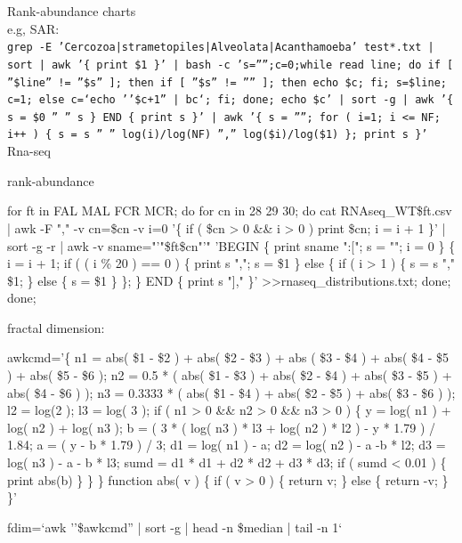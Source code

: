 \documentclass[a4paper]{article}
\begin{document}
Rank-abundance charts\\
e.g, SAR:\\
\texttt{\tiny{grep -E 'Cercozoa|strametopiles|Alveolata|Acanthamoeba' test*.txt | sort | awk '\{ print \$1 \}' |  bash -c 's='''';c=0;while read line; do if [ ''\$line'' != ''\$s'' ]; then if [ ''\$s'' != '''' ]; then echo \$c; fi; s=\$line; c=1; else c=`echo ''\$c+1'' | bc`; fi; done; echo \$c' | sort -g | awk '\{ s = \$0 '' '' s \} END \{ print s \}' | awk '\{ s = ''''; for ( i=1; i <= NF; i++ ) \{ s = s '' '' log(i)/log(NF) '','' log(\$i)/log(\$1) \}; print s \}' }}\\

 
Rna-seq

rank-abundance

for ft in FAL MAL FCR MCR; do for cn in 28 29 30; do cat RNAseq\_WT\$ft.csv | awk -F "," -v cn=\$cn -v i=0 '\{ if ( \$cn > 0 \&\& i > 0 ) print \$cn; i = i + 1 \}' | sort -g -r | awk -v sname="'"\$ft\$cn"'" 'BEGIN \{ print sname ":["; s = ""; i = 0 \} \{ i = i + 1; if ( ( i \% 20 ) == 0 ) \{ print s ","; s = \$1 \} else \{ if ( i > 1 ) \{ s = s "," \$1; \} else \{ s = \$1 \} \}; \} END \{ print s "]," \}' >>rnaseq\_distributions.txt; done; done;

fractal dimension:

{\texttt \small
awkcmd='\{ n1 = abs( \$1 - \$2 ) + abs( \$2 - \$3 ) + abs ( \$3 - \$4 ) + abs(  \$4 - \$5 ) + abs( \$5 - \$6 ); n2 = 0.5 * ( abs(  \$1 - \$3 ) + abs( \$2 - \$4 ) +  abs(  \$3 - \$5 ) + abs( \$4 - \$6 ) ); n3 = 0.3333 * ( abs(  \$1 - \$4 ) + abs( \$2 - \$5 ) + abs( \$3 - \$6 ) ); l2 = log(2 ); l3 = log( 3 );  if ( n1 > 0 \&\& n2 > 0 \&\& n3 > 0 ) \{ y = log( n1 ) + log( n2 ) + log( n3 ); b = ( 3 * ( log( n3 ) * l3 + log( n2 ) * l2 ) - y * 1.79 ) / 1.84; a = ( y - b * 1.79 ) / 3; d1 = log( n1 ) - a; d2 = log( n2 ) - a -b * l2; d3 = log( n3 ) - a - b * l3; sumd = d1 * d1 + d2 * d2 + d3 * d3; if ( sumd < 0.01 ) \{ print abs(b) \} \}  \} function abs( v ) \{ if ( v > 0 ) \{ return v; \} else \{ return -v; \} \}'

fdim=`awk ''\$awkcmd'' | sort -g | head -n \$median | tail -n 1`
}
\end{document}
